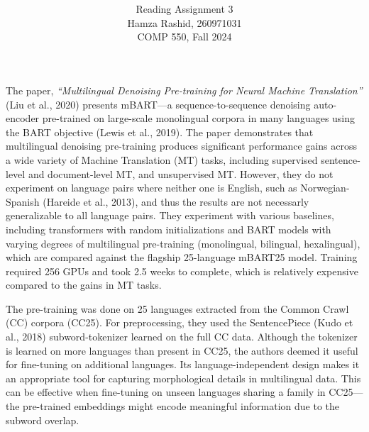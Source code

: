 \documentclass[11pt]{article}
\title{ }
\author{ Reading Assignment 3 \\ Hamza Rashid, 260971031 \\ COMP 550, Fall 2024}
\date{}
\begin{document}
\maketitle

\vspace{-5ex}
The paper, \textit{``Multilingual Denoising Pre-training for Neural Machine Translation''} (Liu et al., 2020) 
presents mBART---a sequence-to-sequence denoising
auto-encoder pre-trained on large-scale monolingual corpora 
in many languages using the BART objective (Lewis et al., 2019). 
The paper demonstrates that multilingual
denoising pre-training produces significant 
performance gains across a wide variety of
Machine Translation (MT) tasks, including supervised
sentence-level and document-level MT, 
and unsupervised MT. However, they do not experiment
on language pairs where neither one is English, such as Norwegian-Spanish (Hareide et al., 2013), and thus the results
are not necessarly generalizable to all language pairs. They experiment with various
baselines, including transformers with random initializations and BART models with varying degrees of multilingual
pre-training (monolingual, bilingual, hexalingual), which are compared against the flagship 25-language mBART25 model. 
Training required 256 GPUs and took 2.5 weeks to complete, which is relatively expensive compared to the gains in MT tasks.

The pre-training was done on 25 languages extracted from the Common Crawl (CC) corpora (CC25).
For preprocessing, they used the SentencePiece (Kudo et al., 2018)
subword-tokenizer learned on the full CC data. 
Although the tokenizer is learned on more languages than present in CC25, 
the authors deemed it useful for fine-tuning on additional languages. Its language-independent
design makes it an appropriate tool for capturing morphological details in multilingual data. 
This can be effective when fine-tuning on unseen languages
sharing a family in CC25---the pre-trained embeddings might encode meaningful
information due to the subword overlap.
\end{document}
